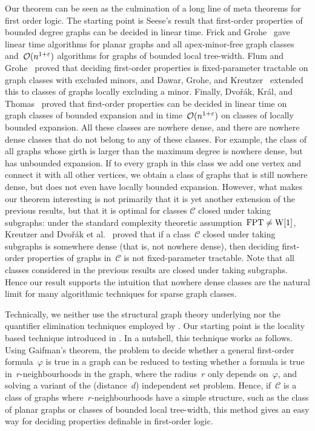 \documentclass[11pt]{article}
\numberwithin{equation}{section}
\newcommand{\CCC}{\mathcal{C}} \newcommand{\DDD}{\mathcal{D}}
\newcommand{\Oof}{\mbox{$\cal O$}}
\renewcommand{\phi}{\varphi}
\renewcommand{\epsilon}{\varepsilon}
\begin{document}
Our theorem can be seen as the culmination of a long line of meta
theorems for first order logic. The starting point is Seese's
\cite{see96} result that first-order properties of bounded degree
graphs can be decided in linear time. Frick and Grohe~\cite{frigro01}
gave linear time algorithms for planar graphs and all apex-minor-free
graph classes and~$\Oof(n^{1+\epsilon})$ algorithms for graphs of
bounded local tree-width. Flum and Grohe~\cite{flugro01} proved that
deciding first-order properties is fixed-parameter tractable on graph
classes with excluded minors, and Dawar, Grohe, and
Kreutzer~\cite{dawgrokre07} extended this to classes of graphs locally
excluding a minor. Finally, Dvo\v r\'ak, Kr\'al, and
Thomas~\cite{dvokratho10} proved that first-order properties can be
decided in linear time on graph classes of bounded expansion and in
time~$\Oof(n^{1+\epsilon})$ on classes of locally bounded
expansion. All these classes are nowhere dense, and there are nowhere
dense classes that do not belong to any of these classes. For example,
the class of all graphs whose girth is larger than the maximum degree
is nowhere dense, but has unbounded expansion. If to every graph in
this class we add one vertex and connect it with all other vertices,
we obtain a class of graphs that is still nowhere dense, but does not
even have locally bounded expansion. However, what makes our theorem
interesting is not primarily that it is yet another extension of the
previous results, but that it is optimal for classes $\mathcal C$
closed under taking subgraphs: under the standard complexity theoretic
assumption~$\textup{FPT}\neq\textup{W[1]}$, Kreutzer \cite{kre11} and
Dvo\v r\'ak et al.~\cite{dvokratho10} proved that if a class~$\mathcal
C$ closed under taking subgraphs is somewhere dense (that is, not
nowhere dense), then deciding first-order properties of graphs
in~$\mathcal C$ is not fixed-parameter tractable. Note that all
classes considered in the previous results are closed under taking
subgraphs.  Hence our result supports the intuition that nowhere dense
classes are the natural limit for many algorithmic techniques for
sparse graph classes.

Technically, we neither use the structural graph theory underlying
\cite{dawgrokre07,flugro01} nor the quantifier elimination techniques
employed by \cite{dvokratho10}. Our starting point is the locality
based technique introduced in \cite{frigro01}. In a nutshell, this
technique works as follows. Using Gaifman's theorem, the problem to
decide whether a general first-order formula~$\phi$ is true in a graph
can be reduced to testing whether a formula is true
in~$r$-neighbourhoods in the graph, where the radius~$r$ only depends
on~$\phi$, and solving a variant of the (distance~$d$) independent set
problem. Hence, if~$\CCC$ is a class of graphs
where~$r$-neighbourhoods have a simple structure, such as the class of
planar
graphs or classes of bounded local tree-width, this method gives
an easy way for deciding properties definable in first-order
logic.
\end{document}
